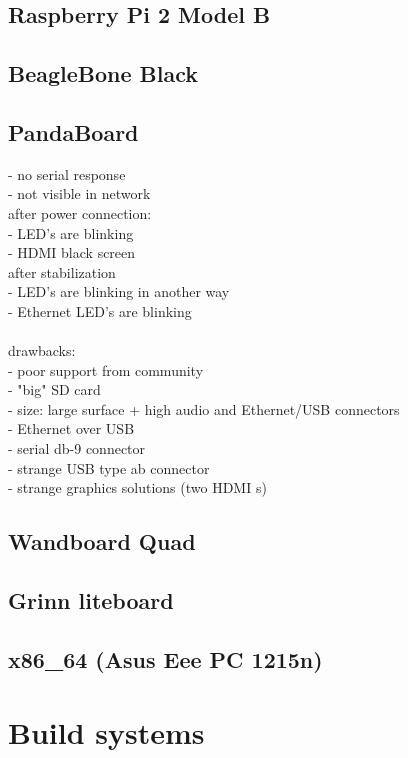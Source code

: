 \documentclass[printmode]{mgr}
\begin{document}
\section{Raspberry Pi 2 Model B}

\section{BeagleBone Black}

\section{PandaBoard}

- no serial response\\
- not visible in network\\
after power connection:\\
- LED's are blinking\\
- HDMI black screen\\
after stabilization\\
- LED's are blinking in another way\\
- Ethernet LED's are blinking\\
\\
drawbacks:\\
- poor support from community\\
- "big" SD card\\
- size: large surface + high audio and Ethernet/USB connectors\\
- Ethernet over USB\\
- serial db-9 connector\\
- strange USB type ab connector\\
- strange graphics solutions (two HDMI s)\\

\section{Wandboard Quad}

\section{Grinn liteboard}

\section{x86\_64 (Asus Eee PC 1215n)}

\chapter{Build systems}
\label{chapter:build systems}
\end{document}

